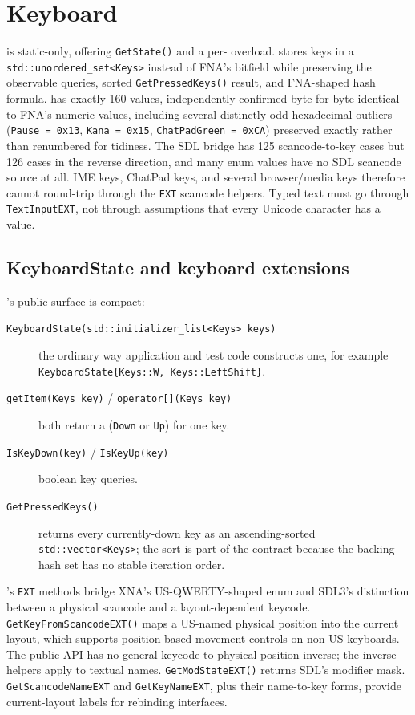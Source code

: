 \section{Keyboard}

 is static-only, offering \texttt{GetState()} and a
per- overload.  stores keys in a
\texttt{std::unordered\_set<Keys>} instead of FNA's bitfield while preserving the observable
queries, sorted \texttt{GetPressedKeys()} result, and FNA-shaped hash formula.  has
exactly
160 values, independently confirmed byte-for-byte identical to FNA's numeric values,
including several distinctly odd hexadecimal outliers (\texttt{Pause = 0x13},
\texttt{Kana = 0x15}, \texttt{ChatPadGreen = 0xCA}) preserved exactly rather than renumbered
for tidiness. The SDL bridge has 125 scancode-to-key cases but 126 cases in the reverse
direction, and many enum values have no SDL scancode source at all. IME keys, ChatPad keys, and
several browser/media keys therefore cannot round-trip through the \texttt{EXT} scancode
helpers. Typed text must go through \texttt{TextInputEXT}, not through assumptions that every
Unicode character has a  value.

\subsection{KeyboardState and keyboard extensions}

's public surface is compact:

\begin{description}
\item[\texttt{KeyboardState(std::initializer\_list<Keys> keys)}] the ordinary way application
  and test code constructs one, for example
  \texttt{KeyboardState\{Keys::W, Keys::LeftShift\}}.
\item[\texttt{getItem(Keys key)} / \texttt{operator[](Keys key)}] both return a
   (\texttt{Down} or \texttt{Up}) for one key.
\item[\texttt{IsKeyDown(key)} / \texttt{IsKeyUp(key)}] boolean key queries.
\item[\texttt{GetPressedKeys()}] returns every currently-down key as an ascending-sorted
  \texttt{std::vector<Keys>}; the sort is part of the contract because the backing hash set has
  no stable iteration order.
\end{description}

's \texttt{EXT} methods bridge XNA's US-QWERTY-shaped  enum
and SDL3's distinction between a physical scancode and a layout-dependent keycode.
\texttt{GetKeyFromScancodeEXT()} maps a US-named physical position into the current layout,
which supports position-based movement controls on non-US keyboards. The public API has no
general keycode-to-physical-position inverse; the inverse helpers apply to textual names.
\texttt{GetModStateEXT()} returns SDL's modifier mask. \texttt{GetScancodeNameEXT} and
\texttt{GetKeyNameEXT}, plus their name-to-key forms, provide current-layout labels for rebinding
interfaces.

